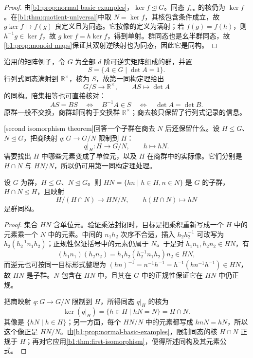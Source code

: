 \begin{proof}
	由\cref{b1:prop:normal-basic-examples}，\(\ker f\trianglelefteq G\)。同态 \(f_{\operatorname{im}}\) 的核仍为 \(\ker f\)。在\cref{b1:thm:quotient-universal}中取 \(N=\ker f\)，其核包含条件成立，故 \(g\ker f\mapsto f(g)\) 良定义且为同态。它按像的定义为满射；若 \(f(g)=f(h)\)，则 \(h^{-1}g\in\ker f\)，故 \(g\ker f=h\ker f\)，得到单射。群同态也是幺半群同态，故\cref{b1:prop:monoid-maps}保证其双射逆映射也为同态，因此它是同构。
\end{proof}

沿用的矩阵例子，令 \(G\) 为全部 \(d\) 阶可逆实矩阵组成的群，并置
\[
	S=\{A\in G\mid\det A=1\}.
\]
行列式同态满射到 \(\mathbb R^\times\)，核为 \(S\)，故第一同构定理给出
\[
	G/S\longrightarrow\mathbb R^\times,\qquad AS\longmapsto\det A
\]
的同构。陪集相等也可直接核对：
\[
	AS=BS \quad\Longleftrightarrow\quad B^{-1}A\in S \quad\Longleftrightarrow\quad \det A=\det B.
\]
原群一般不交换，商群却同构于交换群 \(\mathbb R^\times\)；商去核只保留了行列式记录的信息。

\ProseParagraphBreak
{}[second isomorphism theorem]回答一个子群在商去 \(N\) 后还保留什么。设 \(H\leq G\)、\(N\trianglelefteq G\)，把商映射 \(q:G\rightarrow G/N\) 限制到 \(H\)：
\[
	q|_H:H\longrightarrow G/N,\qquad h\longmapsto hN.
\]
需要找出 \(H\) 中哪些元素变成了单位元，以及 \(H\) 在商群中的实际像。它们分别是 \(H\cap N\) 与 \(HN/N\)，所以仍可用第一同构定理处理。
\begin{theorem}[第二同构定理]\label{b1:thm:second-isomorphism}
	设 \(G\) 为群，\(H\leq G\)、\(N\trianglelefteq G\)。则 \(HN=\{hn\mid h\in H,n\in N\}\) 是 \(G\) 的子群，\(H\cap N\trianglelefteq H\)，且映射
	\[
		H/(H\cap N)\longrightarrow HN/N,\qquad h(H\cap N)\longmapsto hN
	\]
	是群同构。
\end{theorem}

\begin{proof}
	集合 \(HN\) 含单位元。验证乘法封闭时，目标是把乘积重新写成一个 \(H\) 中的元素乘一个 \(N\) 中的元素。中间的 \(n_1h_2\) 次序不合适，插入 \(h_2h_2^{-1}\) 可改写为 \(h_2(h_2^{-1}n_1h_2)\)；正规性保证括号中的元素仍属于 \(N\)。于是对 \(h_1n_1,h_2n_2\in HN\)，有
	\[
		(h_1n_1)(h_2n_2)=h_1h_2(h_2^{-1}n_1h_2)n_2\in HN,
	\]
	而逆元也可按同一目标形式整理为 \((hn)^{-1}=n^{-1}h^{-1}=h^{-1}(hn^{-1}h^{-1})\in HN\)，故 \(HN\) 是子群。\(N\) 包含在 \(HN\) 中，且其在 \(G\) 中的正规性保证它在 \(HN\) 中仍正规。

	把商映射 \(q:G\rightarrow G/N\) 限制到 \(H\)，所得同态 \(q|_H\) 的核为
	\[
		\ker(q|_H)=\{h\in H\mid hN=N\}=H\cap N.
	\]
	其像是 \(\{hN\mid h\in H\}\)；另一方面，每个 \(HN/N\) 中的元素都写成 \(hnN=hN\)，所以这个像正是 \(HN/N\)。由\cref{b1:prop:normal-basic-examples}，限制同态的核 \(H\cap N\) 正规于 \(H\)；再对它应用\cref{b1:thm:first-isomorphism}，便得所述同构及其元素公式。
\end{proof}

